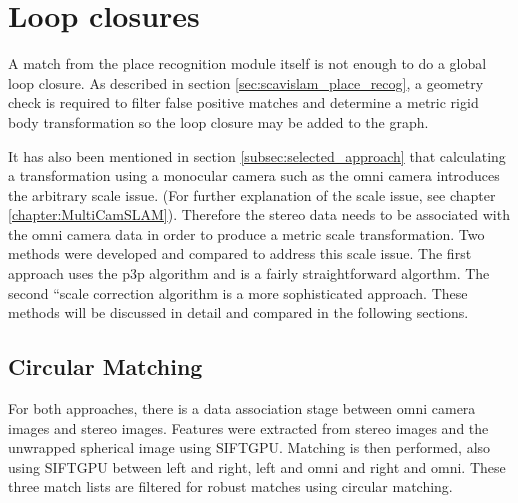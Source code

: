 \section{Loop closures}
\label{sec:calc_loop_edge}

A match from the place recognition module itself is not enough to do a global loop closure.  As described in section \ref{sec:scavislam_place_recog}, a geometry check is required to filter false positive matches and determine a metric rigid body transformation so the loop closure may be added to the graph.

It has also been mentioned in section \ref{subsec:selected_approach} that calculating a transformation using a monocular camera such as the omni camera introduces the arbitrary scale issue.  (For further explanation of the scale issue, see chapter \ref{chapter:MultiCamSLAM}). Therefore the stereo data needs to be associated with the omni camera data in order to produce a metric scale transformation.  Two methods were developed and compared to address this scale issue.  The first approach uses the p3p algorithm and is a fairly straightforward algorthm.  The second ``scale correction algorithm is a more sophisticated approach.  These methods will be discussed in detail and compared in the following sections. 

\subsection{Circular Matching}
\label{subsec:circular_matching}


For both approaches, there is a data association stage between omni camera images and stereo images.  Features were extracted from stereo images and the unwrapped spherical image using SIFTGPU\cite{siftgpu_11}.  Matching is then performed, also using SIFTGPU between left and right, left and omni and right and omni.  These three match lists are filtered for robust matches using circular matching. 

